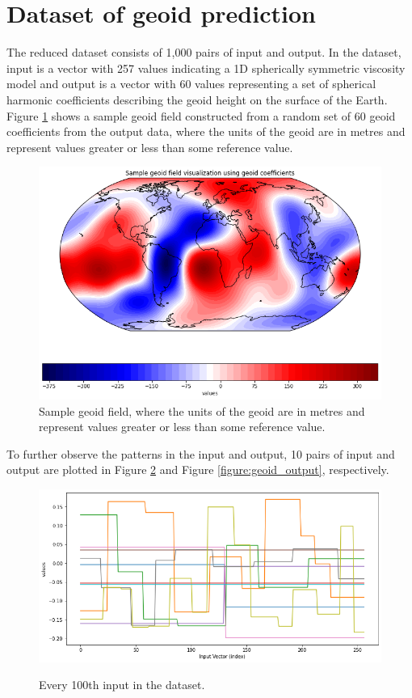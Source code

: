 \section{Dataset of geoid prediction}

The reduced dataset consists of 1,000 pairs of input and output. In the dataset, input is a vector with 257 values indicating a 1D spherically symmetric viscosity model and output is a vector with 60 values representing a set of spherical harmonic coefficients describing the geoid height on the surface of the Earth. Figure \ref{figure:geoid_sample} shows a sample geoid field constructed from a random set of 60 geoid coefficients from the output data, where the units of the geoid are in metres and represent values greater or less than some reference value.

\begin{figure}[H]
    \caption{Sample geoid field, where the units of the geoid are in metres and represent values greater or less than some reference value.}
    \label{figure:geoid_sample}
    \includegraphics[scale=0.6]{figures/geoid_images/Geoid_Sample_visualization.png}
\end{figure}

To further observe the patterns in the input and output, 10 pairs of input and output are plotted in Figure \ref{figure:geoid_input} and Figure \ref{figure:geoid_output}, respectively.

\begin{figure}[H]
    \centering
    \caption{Every 100th input in the dataset.}
    \includegraphics[scale=0.5]{figures/geoid_images/Geoid_sample_input.png}
    \label{figure:geoid_input}
\end{figure}

